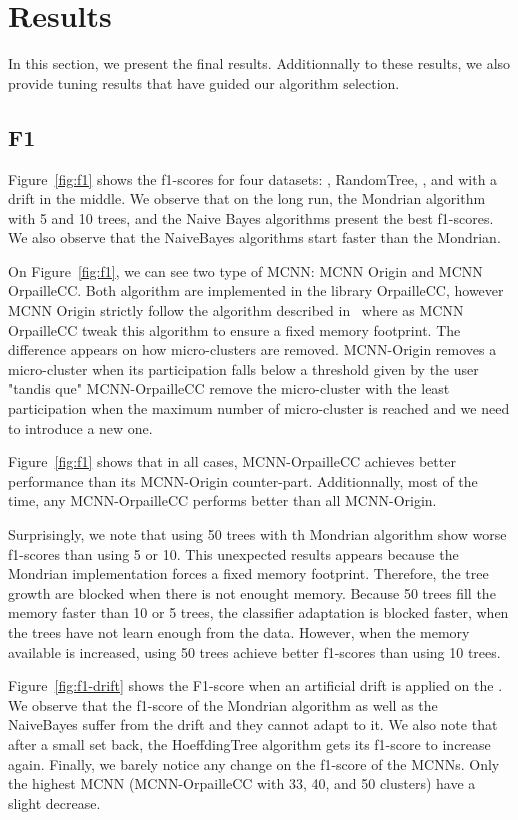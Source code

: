 \section{Results}
In this section, we present the final results. Additionnally to these results,
we also provide tuning results that have guided our algorithm selection.

\subsection{F1}
Figure~\ref{fig:f1} shows the f1-scores for four datasets: \banosdataset,
RandomTree, \recofitdataset, and \banosdataset with a drift in the middle.  We
observe that on the long run, the Mondrian algorithm with 5 and 10 trees, and
the Naive Bayes algorithms present the best f1-scores. We also observe that the
NaiveBayes algorithms start faster than the Mondrian.

On Figure~\ref{fig:f1}, we can see two type of MCNN: MCNN Origin and MCNN
OrpailleCC. Both algorithm are implemented in the library OrpailleCC, however
MCNN Origin strictly follow the algorithm described in~\cite{mc-nn} where as
MCNN OrpailleCC tweak this algorithm to ensure a fixed memory footprint. The
difference appears on how micro-clusters are removed. MCNN-Origin removes a
micro-cluster when its participation falls below a threshold given by the user
"tandis que" MCNN-OrpailleCC remove the micro-cluster with the least
participation when the maximum number of micro-cluster is reached and we need
to introduce a new one.

Figure~\ref{fig:f1} shows that in all cases, MCNN-OrpailleCC achieves better
performance than its MCNN-Origin counter-part. Additionnally, most of the time,
any MCNN-OrpailleCC performs better than all MCNN-Origin.

Surprisingly, we note that using 50 trees with th Mondrian algorithm show worse
f1-scores than using 5 or 10. This unexpected results appears because the
Mondrian implementation forces a fixed memory footprint. Therefore, the tree
growth are blocked when there is not enought memory. Because 50 trees fill the
memory faster than 10 or 5 trees, the classifier adaptation is blocked faster,
when the trees have not learn enough from the data. However, when the memory
available is increased, using 50 trees achieve better f1-scores than using 10
trees.

Figure~\ref{fig:f1-drift} shows the F1-score when an artificial drift is
applied on the \banosdataset. We observe that the f1-score of the Mondrian
algorithm as well as the NaiveBayes suffer from the drift and they cannot adapt
to it. We also note that after a small set back, the HoeffdingTree algorithm
gets its f1-score to increase again. Finally, we barely notice any change on
the f1-score of the MCNNs. Only the highest MCNN (MCNN-OrpailleCC with 33, 40,
and 50 clusters) have a slight decrease.

